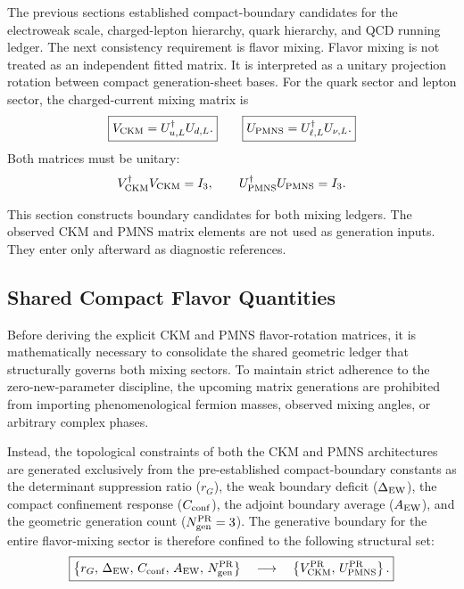 \documentclass[11pt]{article}
\begin{document}
The previous sections established compact-boundary candidates for the electroweak scale, charged-lepton hierarchy, quark hierarchy, and QCD running ledger. The next consistency requirement is flavor mixing. Flavor mixing is not treated as an independent fitted matrix. It is interpreted as a unitary projection rotation between compact generation-sheet bases. For the quark sector and lepton sector, the charged-current mixing matrix is
\begin{equation}
\boxed{
V_{\rm CKM}
=
U_{u,L}^{\dagger}U_{d,L}.
}
\qquad
\boxed{
U_{\rm PMNS}
=
U_{\ell,L}^{\dagger}U_{\nu,L}.
}
\end{equation}
Both matrices must be unitary:
\begin{equation}
V_{\rm CKM}^{\dagger}V_{\rm CKM}=I_3,
\qquad
U_{\rm PMNS}^{\dagger}U_{\rm PMNS}=I_3.
\end{equation}

This section constructs boundary candidates for both mixing ledgers. 
The observed CKM and PMNS matrix elements are not used as generation inputs. 
They enter only afterward as diagnostic references.

\subsection{Shared Compact Flavor Quantities}
\label{sec:pr2_shared_compact_flavor_quantities}

Before deriving the explicit CKM and PMNS flavor-rotation matrices, it is mathematically necessary to consolidate the shared geometric ledger that structurally governs both mixing sectors. To maintain strict adherence to the zero-new-parameter discipline, the upcoming matrix generations are prohibited from importing phenomenological fermion masses, observed mixing angles, or arbitrary complex phases.

Instead, the topological constraints of both the CKM and PMNS architectures are generated exclusively from the pre-established compact-boundary constants as the determinant suppression ratio (\(r_G\)), the weak boundary deficit (\(\Delta_{\rm EW}\)), the compact confinement response (\(C_{\rm conf}\)), the adjoint boundary average (\(A_{\rm EW}\)), and the geometric generation count (\(N_{\rm gen}^{\rm PR}=3\)). The generative boundary for the entire flavor-mixing sector is therefore confined to the following structural set:
\begin{equation}
\boxed{
\left\{
r_G,\,
\Delta_{\rm EW},\,
C_{\rm conf},\,
A_{\rm EW},\,
N_{\rm gen}^{\rm PR}
\right\}
\quad\longrightarrow\quad
\left\{
V_{\rm CKM}^{\rm PR},\,
U_{\rm PMNS}^{\rm PR}
\right\}.
}
\end{equation}
\end{document}

